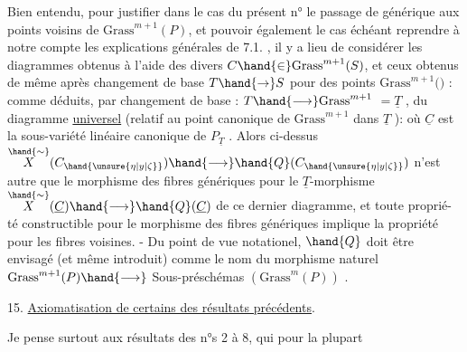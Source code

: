 
Bien entendu, pour justifier dans le cas  du présent n° le passage
de \hand{$\eta$} générique aux points voisins de $\mathrm{Grass}^{m+1}(P)$, et pouvoir également
le cas échéant reprendre à notre compte les explications générales de
7.1. , il y a lieu de considérer les diagrammes
obtenus à l'aide des divers $C \hand{\in} \mathrm{Grass}^{m+1}(S)$, et  ceux obtenus de même
après changement de base $T \hand{\to} S$ pour des points \hand{$\unsure{\xi|\zeta}$} \hand{$\in$} $\mathrm{Grass}^{m+1}($$)$ :
comme déduits, par changement de base \hand{$\unsure{\xi|\zeta}$} : $T \hand{\longrightarrow} \mathrm{Grass}^{m+1}$ $= \underline{T}$ ,
du diagramme \uline{universel} (relatif au point canonique de $\mathrm{Grass}^{m+1}$ dans $\underline{T}$ ):
où $\underline{C}$ est la sous-variété linéaire canonique de $P_{\underline{T}}$ . Alors ci-dessus
$\overset{\hand{\sim}}{X}(C_{\hand{\unsure{\eta|y|\zeta}}}) \hand{\longrightarrow} \hand{Q}(C_{\hand{\unsure{\eta|y|\zeta}}})$ n'est autre que le morphisme des fibres génériques pour
le $\underline{T}$-morphisme $\overset{\hand{\sim}}{X}(\underline{C}) \hand{\longrightarrow} \hand{Q}(\underline{C})$ de ce dernier diagramme, et toute propri\'e-%
té constructible pour  le morphisme des fibres génériques implique
la propriété pour les fibres voisines. - Du point de vue notationel,
$\hand{Q}$ doit être envisagé (et même introduit) comme le nom du morphisme 
naturel $\mathrm{Grass}^{m+1}(P) \hand{\longrightarrow}$  Sous-préschémas $(\mathrm{Grass}^{m}(P))$ .

15. \uline{Axiomatisation de certains des résultats précédents}.

Je pense surtout aux résultats des n°s 2 à 8, qui pour la plupart


